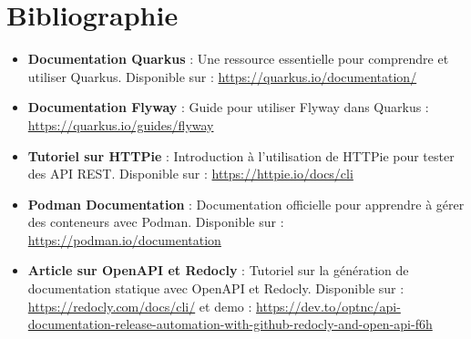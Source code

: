 \documentclass{article}
\begin{document}
	\section{Bibliographie}
	\begin{itemize}
		\item \textbf{Documentation Quarkus} : Une ressource essentielle pour comprendre et utiliser Quarkus. Disponible sur : \url{https://quarkus.io/documentation/}
		\item \textbf{Documentation Flyway} : Guide pour utiliser Flyway dans Quarkus : \url{https://quarkus.io/guides/flyway}
		\item \textbf{Tutoriel sur HTTPie} : Introduction à l'utilisation de HTTPie pour tester des API REST. Disponible sur : \url{https://httpie.io/docs/cli}
		\item \textbf{Podman Documentation} : Documentation officielle pour apprendre à gérer des conteneurs avec Podman. Disponible sur : \url{https://podman.io/documentation}
		\item \textbf{Article sur OpenAPI et Redocly} : Tutoriel sur la génération de documentation statique avec OpenAPI et Redocly. Disponible sur : \url{https://redocly.com/docs/cli/} et demo : \url{https://dev.to/optnc/api-documentation-release-automation-with-github-redocly-and-open-api-f6h}
	\end{itemize}
	
\end{document}
